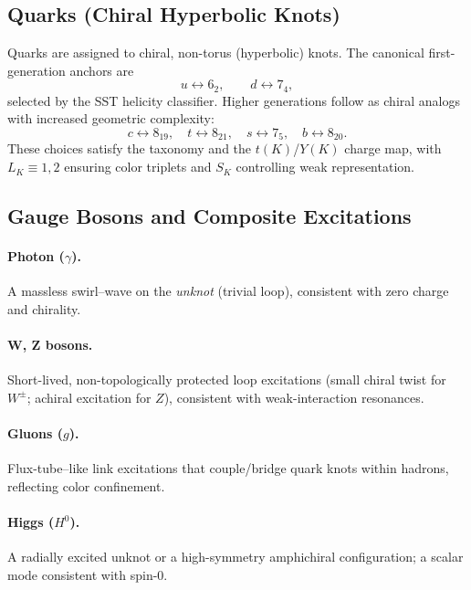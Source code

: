 \documentclass[11pt, preprint,titlepage]{revtex4-2}
\begin{document}
\subsection{Quarks (Chiral Hyperbolic Knots)}

Quarks are assigned to chiral, non-torus (hyperbolic) knots. The canonical first-generation anchors are
\[
    u \leftrightarrow 6_2,\qquad d \leftrightarrow 7_4,
\]
selected by the SST helicity classifier. Higher generations follow as chiral analogs with increased geometric complexity:
\[
    c \leftrightarrow 8_{19},\quad
    t \leftrightarrow 8_{21},\quad
    s \leftrightarrow 7_{5},\quad
    b \leftrightarrow 8_{20}.
\]
These choices satisfy the taxonomy and the $t(K)$/$Y(K)$ charge map, with $L_K\!\equiv\!1,2$ ensuring color triplets and $S_K$ controlling weak representation.

\subsection{Gauge Bosons and Composite Excitations}

\paragraph{Photon ($\gamma$).}
    A massless swirl–wave on the \emph{unknot} (trivial loop), consistent with zero charge and chirality.

\paragraph{W, Z bosons.}
    Short-lived, non-topologically protected loop excitations (small chiral twist for $W^\pm$; achiral excitation for $Z$), consistent with weak-interaction resonances.

\paragraph{Gluons ($g$).}
    Flux-tube–like link excitations that couple/bridge quark knots within hadrons, reflecting color confinement.

\paragraph{Higgs ($H^0$).}
    A radially excited unknot or a high-symmetry amphichiral configuration; a scalar mode consistent with spin-0.
\end{document}
